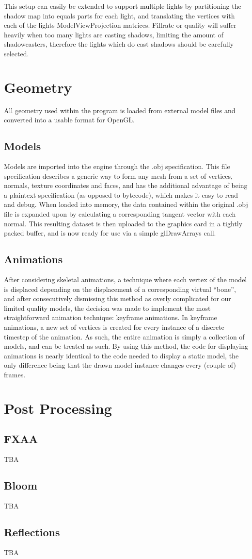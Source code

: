 This setup can easily be extended to support multiple lights by partitioning the shadow map into equals parts for each light, and translating the vertices with each of the lights ModelViewProjection matrices. Fillrate or quality will suffer heavily when too many lights are casting shadows, limiting the amount of shadowcasters, therefore the lights which do cast shadows should be carefully selected.

\section{Geometry}
All geometry used within the program is loaded from external model files and converted into a usable format for OpenGL.

\subsection{Models}
Models are imported into the engine through the .obj specification. This file specification describes a generic way to form any mesh from a set of vertices, normals, texture coordinates and faces, and has the additional advantage of being a plaintext specification (as opposed to bytecode), which makes it easy to read and debug. When loaded into memory, the data contained within the original .obj file is expanded upon by calculating a corresponding tangent vector with each normal. This resulting dataset is then uploaded to the graphics card in a tightly packed buffer, and is now ready for use via a simple glDrawArrays call.
\subsection{Animations}

After considering skeletal animations, a technique where each vertex of the model is displaced depending on the displacement of a corresponding virtual ``bone'', and after consecutively dismissing this method as overly complicated for our limited quality models, the decision was made to implement the most straightforward animation technique: keyframe animations. In keyframe animations, a new set of vertices is created for every instance of a discrete timestep of the animation. As such, the entire animation is simply a collection of models, and can be treated as such. By using this method, the code for displaying animations is nearly identical to the code needed to display a static model, the only difference being that the drawn model instance changes every (couple of) frames.

\section{Post Processing}
\subsection{FXAA}
TBA
\subsection{Bloom}
TBA
\subsection{Reflections}
TBA